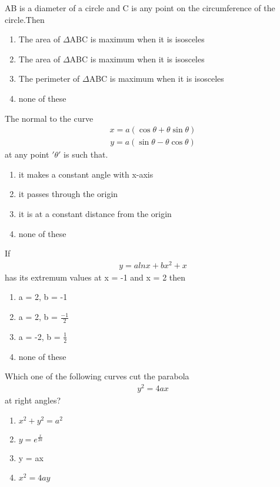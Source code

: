 \item AB is a diameter of a circle and C is any point on the circumference of the circle.Then 
\begin{enumerate}
\item The area of $\Delta$ABC is maximum when it is isosceles
\item The area of $\Delta$ABC is maximum when it is isosceles
\item The perimeter of $\Delta$ABC is maximum when it is isosceles
\item none of these 
\end{enumerate}

\item The normal to the curve 
\begin{align*} 
x = a(\cos \theta + \theta \sin \theta)
\end{align*}
\begin{align*} 
y = a(\sin \theta - \theta \cos \theta) 
\end{align*} at any point $'\theta'$ is such that.
\begin{enumerate}
\item it makes a constant angle with x-axis
\item it passes through the origin 
\item it is at a constant distance from the origin 
\item none of these
\end{enumerate}

\item If 
\begin{align}
y = a lnx + bx^2 + x
\end{align} 
has its extremum values at x = -1 and x = 2 then 
\begin{enumerate}
\item a = 2, b = -1
\item a = 2, b = $\frac{-1}{2}$
\item a = -2, b = $\frac{1}{2}$
\item none of these
\end{enumerate}

\item Which one of the following curves cut the parabola 
\begin{align} 
y^2 = 4ax
\end{align} 
at right angles?
\begin{enumerate}
\item $x^2+ y^2 = a^2$
\item $y = e^{\frac{x}{2a}}$
\item y = ax
\item $x^2 = 4ay$
\end{enumerate}

